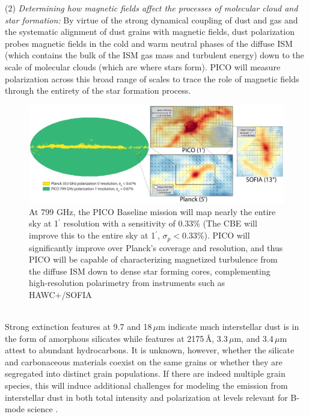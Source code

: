 \documentclass[PICOReport.tex]{subfiles}
\begin{document}
(2) {\em Determining how magnetic fields affect the processes of molecular cloud and star formation:}
By virtue of the strong dynamical coupling of dust and gas and the systematic alignment of dust grains with magnetic fields, dust polarization probes magnetic fields in the cold and warm neutral phases of the diffuse ISM (which contains the bulk of the ISM gas mass and turbulent energy) down to the scale of molecular clouds (which are where stars form). PICO will measure polarization across this broad range of scales to trace the role of magnetic fields through the entirety of the star formation process.
%
%
\begin{figure}
    \centering
    \includegraphics[width=6.5in]{images/galsci_fig_v4.pdf}
    \caption{At 799 GHz, the PICO Baseline mission will map nearly the entire sky at 1$^{\prime}$ resolution with a sensitivity of 0.33\% (The CBE will improve this to the entire sky at 1$^\prime$, $\sigma_p<0.33\%$). PICO will significantly improve over Planck's coverage and resolution, and thus PICO will be capable of characterizing magnetized turbulence from the diffuse ISM down to dense star forming cores, complementing high-resolution polarimetry from instruments such as HAWC+/SOFIA \citep{Chuss2018}}
    \label{fig:allsky}
\end{figure}

\vspace{0.1in}
 \\
Strong extinction features at 9.7 and 18\,$\mu$m indicate much interstellar dust is in the form of amorphous silicates while features at 2175\,\AA, 3.3\,$\mu$m, and 3.4\,$\mu$m attest to abundant hydrocarbons. It is unknown, however, whether the silicate and carbonaceous materials coexist on the same grains or whether they are segregated into distinct grain populations. If there are indeed multiple grain species, this will induce additional challenges for modeling the emission from interstellar dust in both total intensity and polarization at levels relevant for B-mode science \citep{Hensley2018}.
\end{document}
